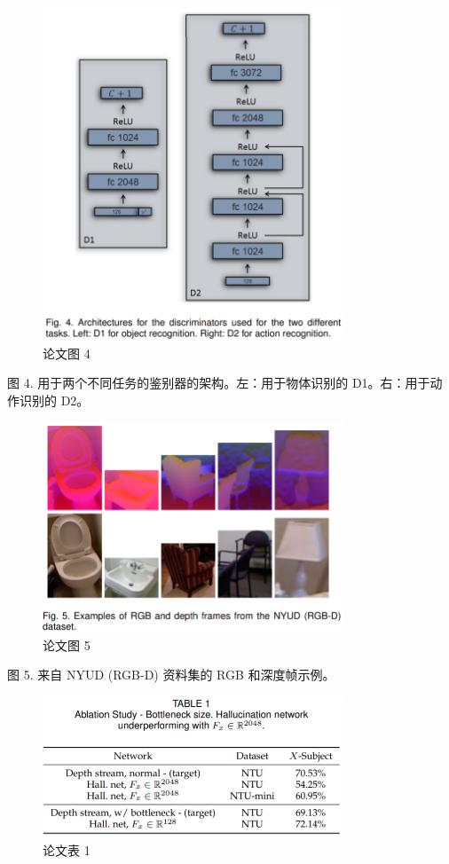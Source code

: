 \begin{figure}[htb]
\centering 
\includegraphics[width=0.80\textwidth]{img/c1m4.png} 
\caption{论文图 4}
\label{Test}
\end{figure}

图 4. 用于两个不同任务的鉴别器的架构。左：用于物体识别的 D1。右：用于动作识别的 D2。

\begin{figure}[htb]
\centering 
\includegraphics[width=0.80\textwidth]{img/c1m5.png} 
\caption{论文图 5}
\label{Test}
\end{figure}

图 5. 来自 NYUD (RGB-D) 资料集的 RGB 和深度帧示例。

\begin{figure}[htb]
\centering 
\includegraphics[width=0.80\textwidth]{img/c1m6.png} 
\caption{论文表 1}
\label{Test}
\end{figure}

